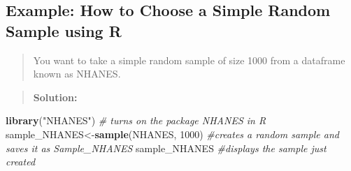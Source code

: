 \documentclass[]{book}
\newenvironment{Shaded}{\begin{snugshade}}{\end{snugshade}}
\newcommand{\CommentTok}[1]{\textcolor[rgb]{0.56,0.35,0.01}{\textit{#1}}}
\newcommand{\DecValTok}[1]{\textcolor[rgb]{0.00,0.00,0.81}{#1}}
\newcommand{\KeywordTok}[1]{\textcolor[rgb]{0.13,0.29,0.53}{\textbf{#1}}}
\newcommand{\NormalTok}[1]{#1}
\newcommand{\StringTok}[1]{\textcolor[rgb]{0.31,0.60,0.02}{#1}}
\begin{document}
\hypertarget{example-how-to-choose-a-simple-random-sample-using-r}{%
\subsection{Example: How to Choose a Simple Random Sample using R}\label{example-how-to-choose-a-simple-random-sample-using-r}}

\begin{quote}
You want to take a simple random sample of size 1000 from a dataframe known as NHANES.
\end{quote}

\begin{quote}
\textbf{Solution:}
\end{quote}

\begin{Shaded}
\begin{Highlighting}[]
\KeywordTok{library}\NormalTok{(}\StringTok{"NHANES"}\NormalTok{) }\CommentTok{# turns on the package NHANES in R}
\NormalTok{sample_NHANES<-}\KeywordTok{sample}\NormalTok{(NHANES, }\DecValTok{1000}\NormalTok{) }\CommentTok{#creates a random sample and saves it as Sample_NHANES}
\NormalTok{sample_NHANES }\CommentTok{#displays the sample just created}
\end{Highlighting}
\end{Shaded}
\end{document}
